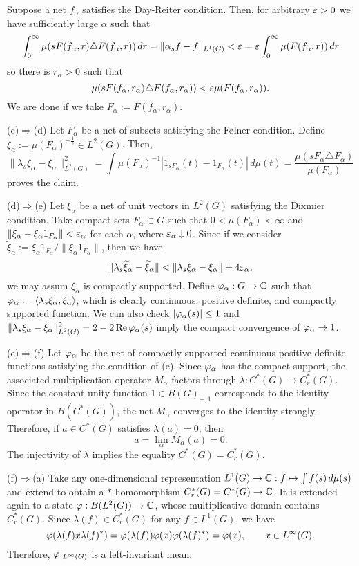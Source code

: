 \documentclass{../../../small}
\begin{document}
\begin{pf}
Suppose a net $f_\alpha$ satisfies the Day-Reiter condition.
Then, for arbitrary $\varepsilon>0$ we have sufficiently large $\alpha$ such that
\[\int_0^\infty\mu(sF(f_\alpha,r)\triangle F(f_\alpha,r))\,dr=\|\alpha_sf-f\|_{L^1(G)}<\varepsilon=\varepsilon\int_0^\infty\mu(F(f_\alpha,r))\,dr\]
so there is $r_\alpha>0$ such that
\[\mu(sF(f_\alpha,r_\alpha)\triangle F(f_\alpha,r_\alpha))<\varepsilon\mu(F(f_\alpha,r_\alpha)).\]
We are done if we take $F_\alpha:=F(f_\alpha,r_\alpha)$.

(c)$\Rightarrow$(d)
Let $F_\alpha$ be a net of subsets satisfying the F\o lner condition.
Define $\xi_\alpha:=\mu(F_\alpha)^{-\frac12}\in L^2(G)$.
Then,
\[\|\lambda_s\xi_\alpha-\xi_\alpha\|_{L^2(G)}^2=\int\mu(F_\alpha)^{-1}|1_{sF_\alpha}(t)-1_{F_\alpha}(t)|\,d\mu(t)=\frac{\mu(sF_\alpha\triangle F_\alpha)}{\mu(F_\alpha)}\]
proves the claim.

(d)$\Rightarrow$(e)
Let $\xi_\alpha$ be a net of unit vectors in $L^2(G)$ satisfying the Dixmier condition.
Take compact sets $F_\alpha\subset G$ such that $0<\mu(F_\alpha)<\infty$ and $\|\xi_\alpha-\xi_\alpha1_{F_\alpha}\|<\varepsilon_\alpha$ for each $\alpha$, where $\varepsilon_\alpha\downarrow0$.
Since if we consider $\tilde\xi_\alpha:=\xi_\alpha1_{F_\alpha}/\|\xi_\alpha1_{F_\alpha}\|$, then we have
\[\|\lambda_s\widetilde\xi_\alpha-\widetilde\xi_\alpha\|<\|\lambda_s\xi_\alpha-\xi_\alpha\|+4\varepsilon_\alpha,\]
we may assum $\xi_\alpha$ is compactly supported.
Define $\varphi_\alpha:G\to\mathbb{C}$ such that $\varphi_\alpha:=\langle\lambda_s\xi_\alpha,\xi_\alpha\rangle$, which is clearly continuous, positive definite, and compactly supported function.
We can also check $|\varphi_\alpha(s)|\le1$ and $\|\lambda_s\xi_\alpha-\xi_\alpha\|_{L^2(G)}^2=2-2\operatorname{Re}\varphi_\alpha(s)$ imply the compact convergence of $\varphi_\alpha\to1$.

(e)$\Rightarrow$(f)
Let $\varphi_\alpha$ be the net of compactly supported continuous positive definite functions satisfying the condition of (e).
Since $\varphi_\alpha$ has the compact support, the associated multiplication operator $M_\alpha$ factors through $\lambda:C^*(G)\to C_r^*(G)$.
Since the constant unity function $1\in B(G)_{+,1}$ corresponds to the identity operator in $B(C^*(G))$, the net $M_\alpha$ converges to the identity strongly.
Therefore, if $a\in C^*(G)$ satisfies $\lambda(a)=0$, then
\[a=\lim_\alpha M_\alpha(a)=0.\]
The injectivity of $\lambda$ implies the equality $C^*(G)=C_r^*(G)$.

(f)$\Rightarrow$(a)
Take any one-dimensional representation $L^1(G)\to\mathbb{C}:f\mapsto\int f(s)\,d\mu(s)$ and extend to obtain a $*$-homomorphism $C_r^*(G)=C^*(G)\to\mathbb{C}$.
It is extended again to a state $\varphi:B(L^2(G))\to\mathbb{C}$, whose multiplicative domain contains $C_r^*(G)$.
Since $\lambda(f)\in C_r^*(G)$ for any $f\in L^1(G)$, we have
\[\varphi(\lambda(f)x\lambda(f)^*)=\varphi(\lambda(f))\varphi(x)\varphi(\lambda(f)^*)=\varphi(x),\qquad x\in L^\infty(G).\]
Therefore, $\varphi|_{L^\infty(G)}$ is a left-invariant mean.
\end{pf}
\end{document}
